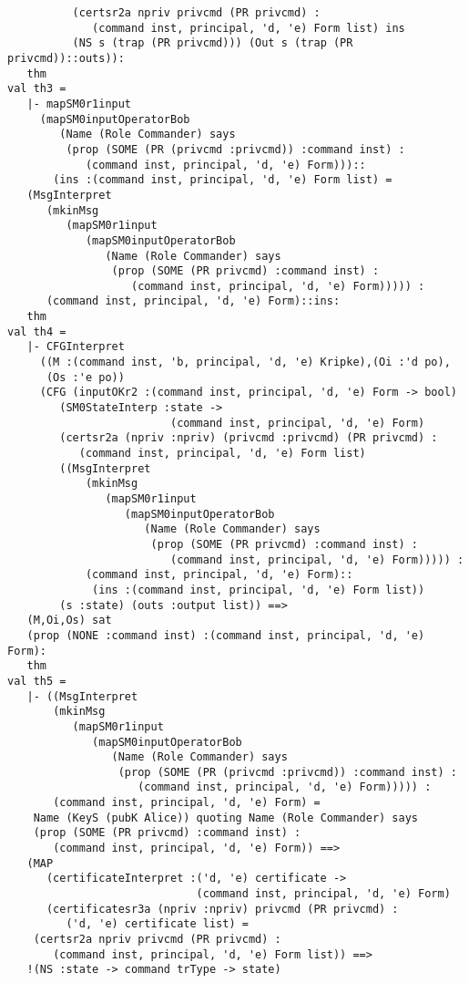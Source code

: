 \documentclass{report}
\begin{document}
\begin{session}
\begin{scriptsize}
\begin{verbatim}
          (certsr2a npriv privcmd (PR privcmd) :
             (command inst, principal, 'd, 'e) Form list) ins
          (NS s (trap (PR privcmd))) (Out s (trap (PR privcmd))::outs)):
   thm
val th3 =
   |- mapSM0r1input
     (mapSM0inputOperatorBob
        (Name (Role Commander) says
         (prop (SOME (PR (privcmd :privcmd)) :command inst) :
            (command inst, principal, 'd, 'e) Form)))::
       (ins :(command inst, principal, 'd, 'e) Form list) =
   (MsgInterpret
      (mkinMsg
         (mapSM0r1input
            (mapSM0inputOperatorBob
               (Name (Role Commander) says
                (prop (SOME (PR privcmd) :command inst) :
                   (command inst, principal, 'd, 'e) Form))))) :
      (command inst, principal, 'd, 'e) Form)::ins:
   thm
val th4 =
   |- CFGInterpret
     ((M :(command inst, 'b, principal, 'd, 'e) Kripke),(Oi :'d po),
      (Os :'e po))
     (CFG (inputOKr2 :(command inst, principal, 'd, 'e) Form -> bool)
        (SM0StateInterp :state ->
                         (command inst, principal, 'd, 'e) Form)
        (certsr2a (npriv :npriv) (privcmd :privcmd) (PR privcmd) :
           (command inst, principal, 'd, 'e) Form list)
        ((MsgInterpret
            (mkinMsg
               (mapSM0r1input
                  (mapSM0inputOperatorBob
                     (Name (Role Commander) says
                      (prop (SOME (PR privcmd) :command inst) :
                         (command inst, principal, 'd, 'e) Form))))) :
            (command inst, principal, 'd, 'e) Form)::
             (ins :(command inst, principal, 'd, 'e) Form list))
        (s :state) (outs :output list)) ==>
   (M,Oi,Os) sat
   (prop (NONE :command inst) :(command inst, principal, 'd, 'e) Form):
   thm
val th5 =
   |- ((MsgInterpret
       (mkinMsg
          (mapSM0r1input
             (mapSM0inputOperatorBob
                (Name (Role Commander) says
                 (prop (SOME (PR (privcmd :privcmd)) :command inst) :
                    (command inst, principal, 'd, 'e) Form))))) :
       (command inst, principal, 'd, 'e) Form) =
    Name (KeyS (pubK Alice)) quoting Name (Role Commander) says
    (prop (SOME (PR privcmd) :command inst) :
       (command inst, principal, 'd, 'e) Form)) ==>
   (MAP
      (certificateInterpret :('d, 'e) certificate ->
                             (command inst, principal, 'd, 'e) Form)
      (certificatesr3a (npriv :npriv) privcmd (PR privcmd) :
         ('d, 'e) certificate list) =
    (certsr2a npriv privcmd (PR privcmd) :
       (command inst, principal, 'd, 'e) Form list)) ==>
   !(NS :state -> command trType -> state)

\end{verbatim}
\end{scriptsize}
\end{session}
\end{document}

